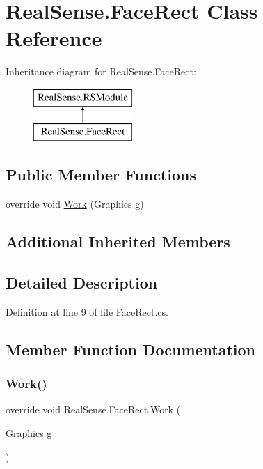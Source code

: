 \hypertarget{class_real_sense_1_1_face_rect}{}\section{Real\+Sense.\+Face\+Rect Class Reference}
\label{class_real_sense_1_1_face_rect}
Inheritance diagram for Real\+Sense.\+Face\+Rect\+:\begin{figure}[H]
\begin{center}
\leavevmode
\includegraphics[height=2.000000cm]{class_real_sense_1_1_face_rect}
\end{center}
\end{figure}
\subsection*{Public Member Functions}
\begin{DoxyCompactItemize}
\item 
override void \hyperlink{class_real_sense_1_1_face_rect_aa2dbacb2ec8ac50b8fc19d02ceba2c0a}{Work} (Graphics g)
\end{DoxyCompactItemize}
\subsection*{Additional Inherited Members}


\subsection{Detailed Description}


Definition at line 9 of file Face\+Rect.\+cs.



\subsection{Member Function Documentation}
\mbox{\label{class_real_sense_1_1_face_rect_aa2dbacb2ec8ac50b8fc19d02ceba2c0a}} 
\subsubsection{\texorpdfstring{Work()}{Work()}}
{\footnotesize\ttfamily override void Real\+Sense.\+Face\+Rect.\+Work (\begin{DoxyParamCaption}\item[{Graphics}]{g }\end{DoxyParamCaption})\hspace{0.3cm}{\ttfamily [virtual]}}

